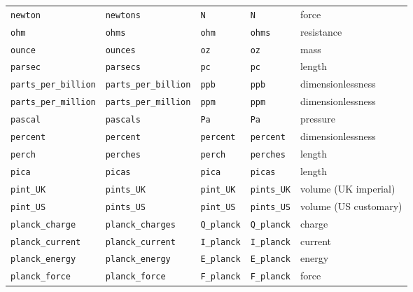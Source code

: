 \begin{landscape}
\begin{center}
\begin{longtable}{|lllll|}
{\tt\footnotesize newton} & {\tt\footnotesize newtons} & {\tt\footnotesize N} & {\tt\footnotesize N} & force \\
{\tt\footnotesize ohm} & {\tt\footnotesize ohms} & {\tt\footnotesize ohm} & {\tt\footnotesize ohms} & resistance \\
{\tt\footnotesize ounce} & {\tt\footnotesize ounces} & {\tt\footnotesize oz} & {\tt\footnotesize oz} & mass \\
{\tt\footnotesize parsec} & {\tt\footnotesize parsecs} & {\tt\footnotesize pc} & {\tt\footnotesize pc} & length \\
{\tt\footnotesize parts\_per\_billion} & {\tt\footnotesize parts\_per\_billion} & {\tt\footnotesize ppb} & {\tt\footnotesize ppb} & dimensionlessness \\
{\tt\footnotesize parts\_per\_million} & {\tt\footnotesize parts\_per\_million} & {\tt\footnotesize ppm} & {\tt\footnotesize ppm} & dimensionlessness \\
{\tt\footnotesize pascal} & {\tt\footnotesize pascals} & {\tt\footnotesize Pa} & {\tt\footnotesize Pa} & pressure \\
{\tt\footnotesize percent} & {\tt\footnotesize percent} & {\tt\footnotesize percent} & {\tt\footnotesize percent} & dimensionlessness \\
{\tt\footnotesize perch} & {\tt\footnotesize perches} & {\tt\footnotesize perch} & {\tt\footnotesize perches} & length \\
{\tt\footnotesize pica} & {\tt\footnotesize picas} & {\tt\footnotesize pica} & {\tt\footnotesize picas} & length \\
{\tt\footnotesize pint\_UK} & {\tt\footnotesize pints\_UK} & {\tt\footnotesize pint\_UK} & {\tt\footnotesize pints\_UK} & volume (UK imperial) \\
{\tt\footnotesize pint\_US} & {\tt\footnotesize pints\_US} & {\tt\footnotesize pint\_US} & {\tt\footnotesize pints\_US} & volume (US customary) \\
{\tt\footnotesize planck\_charge} & {\tt\footnotesize planck\_charges} & {\tt\footnotesize Q\_planck} & {\tt\footnotesize Q\_planck} & charge \\
{\tt\footnotesize planck\_current} & {\tt\footnotesize planck\_current} & {\tt\footnotesize I\_planck} & {\tt\footnotesize I\_planck} & current \\
{\tt\footnotesize planck\_energy} & {\tt\footnotesize planck\_energy} & {\tt\footnotesize E\_planck} & {\tt\footnotesize E\_planck} & energy \\
{\tt\footnotesize planck\_force} & {\tt\footnotesize planck\_force} & {\tt\footnotesize F\_planck} & {\tt\footnotesize F\_planck} & force \\

\end{longtable}
\end{center}
\end{landscape}
